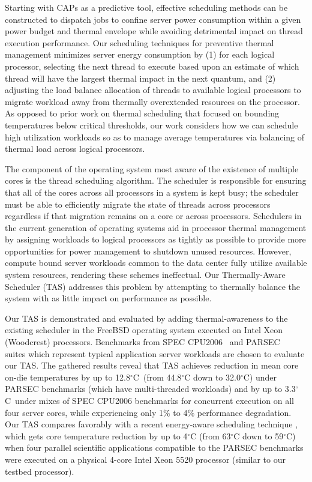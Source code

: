 Starting with CAPs as a predictive tool, effective scheduling methods
can be constructed to dispatch jobs to confine server power consumption
within a given power budget and thermal envelope while avoiding
detrimental impact on thread execution performance.  Our scheduling
techniques for preventive thermal management minimizes server energy
consumption by (1) for each logical processor, selecting the next thread
to execute based upon an estimate of which thread will have the largest
thermal impact in the next quantum, and (2) adjusting the load balance
allocation of threads to available logical processors to migrate
workload away from thermally overextended resources on the processor.
As opposed to prior work on thermal scheduling
\cite{Gomaa2004,Choi2007,Yang2008,Sarood2011} that focused on bounding
temperatures below critical thresholds, our work considers how we can
schedule high utilization workloads so as to manage average temperatures
via balancing of thermal load across logical processors.

The component of the operating system most aware of the existence of
multiple cores is the thread scheduling algorithm.  The scheduler is
responsible for ensuring that all of the cores across all processors in
a system is kept busy; the scheduler must be able to efficiently migrate
the state of threads across processors regardless if that migration
remains on a core or across processors.  Schedulers in the current
generation of operating systems aid in processor thermal management by
assigning workloads to logical processors as tightly as possible to
provide more opportunities for power management to shutdown unused
resources. However, compute bound server workloads common to the data
center fully utilize available system resources, rendering these schemes
ineffectual.  Our Thermally-Aware Scheduler (TAS) addresses this problem
by attempting to thermally balance the system with as little impact on
performance as possible.

Our TAS is demonstrated and evaluated by adding thermal-awareness to the
existing scheduler in the FreeBSD operating system executed on Intel
Xeon (Woodcrest) processors.  Benchmarks from SPEC
CPU2006~\cite{Henning2006} and PARSEC~\cite{Bienia2011} suites which
represent typical application server workloads are chosen to evaluate
our TAS.  The gathered results reveal that TAS achieves reduction in
mean core on-die temperatures by up to 12.8$^{\circ}$C\ (from
44.8$^\circ$C down to 32.0$^\circ$C) under PARSEC benchmarks (which have
multi-threaded workloads) and by up to 3.3$^{\circ}$C\ under mixes of
SPEC CPU2006 benchmarks for concurrent execution on all four server
cores, while experiencing only 1\% to 4\% performance degradation.  Our
TAS compares favorably with a recent energy-aware scheduling technique
\cite{Sarood2011}, which gets core temperature reduction by up to
4$^\circ$C (from 63$^\circ$C down to 59$^\circ$C) when four parallel
scientific applications compatible to the PARSEC benchmarks were executed on
a physical 4-core Intel Xeon 5520 processor (similar to our testbed
processor).

